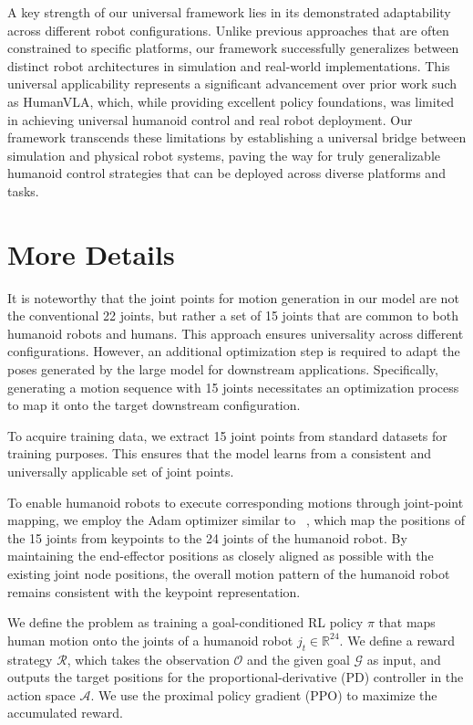 A key strength of our universal framework lies in its demonstrated adaptability across different robot configurations. Unlike previous approaches that are often constrained to specific platforms, our framework successfully generalizes between distinct robot architectures in simulation and real-world implementations. This universal applicability represents a significant advancement over prior work such as HumanVLA, which, while providing excellent policy foundations, was limited in achieving universal humanoid control and real robot deployment. Our framework transcends these limitations by establishing a universal bridge between simulation and physical robot systems, paving the way for truly generalizable humanoid control strategies that can be deployed across diverse platforms and tasks.


\section{More Details}
It is noteworthy that the joint points for motion generation in our model are not the conventional 22 joints, but rather a set of 15 joints that are common to both humanoid robots and humans. This approach ensures universality across different configurations. However, an additional optimization step is required to adapt the poses generated by the large model for downstream applications. Specifically, generating a motion sequence with 15 joints necessitates an optimization process to map it onto the target downstream configuration.

To acquire training data, we extract 15 joint points from standard datasets for training purposes. This ensures that the model learns from a consistent and universally applicable set of joint points.

To enable humanoid robots to execute corresponding motions through joint-point mapping, we employ the Adam optimizer similar to ~\cite{mao2024learning, jiang2024harmon}, which map the positions of the 15 joints from keypoints to the 24 joints of the humanoid robot. By maintaining the end-effector positions as closely aligned as possible with the existing joint node positions, the overall motion pattern of the humanoid robot remains consistent with the keypoint representation.

We define the problem as training a goal-conditioned RL policy $\pi$ that maps human motion onto the joints of a humanoid robot $j_t\in \mathbb{R}^{24}$. We define a reward strategy $\mathcal{R}$, which takes the observation $\mathcal{O}$ and the given goal $\mathcal{G}$ as input, and outputs the target positions for the proportional-derivative (PD) controller in the action space $\mathcal{A}$. We use the proximal policy gradient (PPO) to maximize the accumulated reward.



